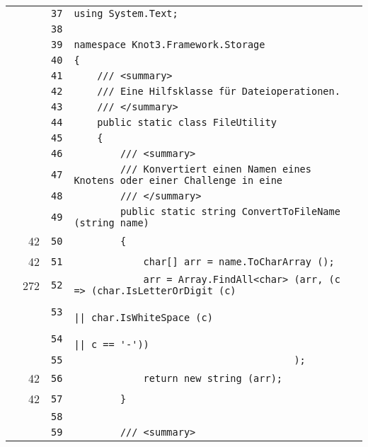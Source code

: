 \documentclass[a4paper,10pt]{article}
\begin{document}
\begin{longtable}[l]{lrrl}
\cellcolor{gray} &  & \verb~37~ & \verb~using System.Text;~\\
\cellcolor{gray} &  & \verb~38~ & \verb~~\\
\cellcolor{gray} &  & \verb~39~ & \verb~namespace Knot3.Framework.Storage~\\
\cellcolor{gray} &  & \verb~40~ & \verb~{~\\
\cellcolor{gray} &  & \verb~41~ & \verb~    /// <summary>~\\
\cellcolor{gray} &  & \verb~42~ & \verb~    /// Eine Hilfsklasse für Dateioperationen.~\\
\cellcolor{gray} &  & \verb~43~ & \verb~    /// </summary>~\\
\cellcolor{gray} &  & \verb~44~ & \verb~    public static class FileUtility~\\
\cellcolor{gray} &  & \verb~45~ & \verb~    {~\\
\cellcolor{gray} &  & \verb~46~ & \verb~        /// <summary>~\\
\cellcolor{gray} &  & \verb~47~ & \verb~        /// Konvertiert einen Namen eines Knotens oder einer Challenge in eine~\\
\cellcolor{gray} &  & \verb~48~ & \verb~        /// </summary>~\\
\cellcolor{gray} &  & \verb~49~ & \verb~        public static string ConvertToFileName (string name)~\\
\cellcolor{green} & 42 & \verb~50~ & \verb~        {~\\
\cellcolor{green} & 42 & \verb~51~ & \verb~            char[] arr = name.ToCharArray ();~\\
\cellcolor{green} & 272 & \verb~52~ & \verb~            arr = Array.FindAll<char> (arr, (c => (char.IsLetterOrDigit (c)~\\
\cellcolor{gray} &  & \verb~53~ & \verb~                                                   || char.IsWhiteSpace (c)~\\
\cellcolor{gray} &  & \verb~54~ & \verb~                                                   || c == '-'))~\\
\cellcolor{gray} &  & \verb~55~ & \verb~                                      );~\\
\cellcolor{green} & 42 & \verb~56~ & \verb~            return new string (arr);~\\
\cellcolor{green} & 42 & \verb~57~ & \verb~        }~\\
\cellcolor{gray} &  & \verb~58~ & \verb~~\\
\cellcolor{gray} &  & \verb~59~ & \verb~        /// <summary>~\\

\end{longtable}
\end{document}
